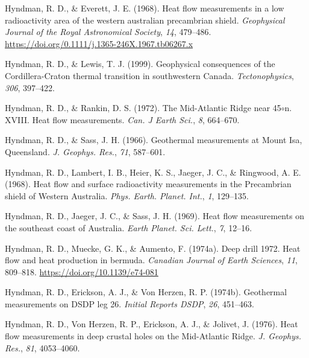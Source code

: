 \documentclass[draft,linenumbers]{agujournal2018}
\begin{document}
\leavevmode{}%
Hyndman, R. D., \& Everett, J. E. (1968). Heat flow measurements in a
low radioactivity area of the western australian precambrian shield.
\emph{Geophysical Journal of the Royal Astronomical Society}, \emph{14},
479--486. \url{https://doi.org/0.1111/j.1365-246X.1967.tb06267.x}

\leavevmode{}%
Hyndman, R. D., \& Lewis, T. J. (1999). Geophysical consequences of the
{Cordillera-Craton} thermal transition in southwestern {Canada}.
\emph{Tectonophysics}, \emph{306}, 397--422.

\leavevmode{}%
Hyndman, R. D., \& Rankin, D. S. (1972). The {Mid-Atlantic Ridge} near
45\(\circ\)n. XVIII. Heat flow measurements. \emph{Can. J Earth Sci.},
\emph{8}, 664--670.

\leavevmode{}%
Hyndman, R. D., \& Sass, J. H. (1966). Geothermal measurements at {Mount
Isa, Queensland}. \emph{J. Geophys. Res.}, \emph{71}, 587--601.

\leavevmode{}%
Hyndman, R. D., Lambert, I. B., Heier, K. S., Jaeger, J. C., \&
Ringwood, A. E. (1968). Heat flow and surface radioactivity measurements
in the {Precambrian shield of Western Australia}. \emph{Phys. Earth.
Planet. Int.}, \emph{1}, 129--135.

\leavevmode{}%
Hyndman, R. D., Jaeger, J. C., \& Sass, J. H. (1969). Heat flow
measurements on the southeast coast of {Australia}. \emph{Earth Planet.
Sci. Lett.}, \emph{7}, 12--16.

\leavevmode{}%
Hyndman, R. D., Muecke, G. K., \& Aumento, F. (1974a). Deep drill 1972.
Heat flow and heat production in bermuda. \emph{Canadian Journal of
Earth Sciences}, \emph{11}, 809--818.
\url{https://doi.org/10.1139/e74-081}

\leavevmode{}%
Hyndman, R. D., Erickson, A. J., \& Von Herzen, R. P. (1974b).
Geothermal measurements on DSDP leg 26. \emph{Initial Reports DSDP},
\emph{26}, 451--463.

\leavevmode{}%
Hyndman, R. D., Von Herzen, R. P., Erickson, A. J., \& Jolivet, J.
(1976). Heat flow measurements in deep crustal holes on the
{Mid-Atlantic Ridge}. \emph{J. Geophys. Res.}, \emph{81}, 4053--4060.
\end{document}

